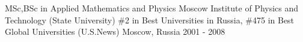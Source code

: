
\begin{cventries}

  \cventry
    {MSc,BSc in Applied Mathematics and Physics} %
    {Moscow Institute of Physics and Technology (State University)} %
    {\#2 in Best Universities in Russia, \#475 in Best Global Universities (U.S.News)}
    {Moscow, Russia} %
    {2001 - 2008} %
    {}

\end{cventries}
